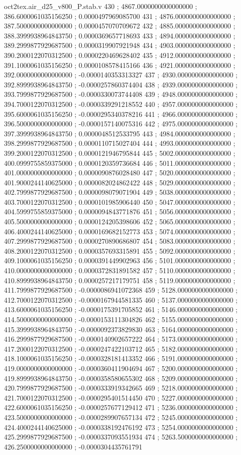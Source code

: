 \begin{filecontents}[overwrite]{oct2tex.air_d25_v800_P.stab.v}
430 ; 4867.0000000000000000 ; 386.6000061035156250 ; 0.0000497969085700
431 ; 4876.0000000000000000 ; 387.5000000000000000 ; 0.0000457070709672
432 ; 4885.0000000000000000 ; 388.3999938964843750 ; 0.0000369657718693
433 ; 4894.0000000000000000 ; 389.2999877929687500 ; 0.0000319907921948
434 ; 4903.0000000000000000 ; 390.2000122070312500 ; 0.0000220469628402
435 ; 4912.0000000000000000 ; 391.1000061035156250 ; 0.0000108578415166
436 ; 4921.0000000000000000 ; 392.0000000000000000 ; -0.0000140353313327
437 ; 4930.0000000000000000 ; 392.8999938964843750 ; -0.0000257860374404
438 ; 4939.0000000000000000 ; 393.7999877929687500 ; -0.0000330073744408
439 ; 4948.0000000000000000 ; 394.7000122070312500 ; -0.0000339291218552
440 ; 4957.0000000000000000 ; 395.6000061035156250 ; -0.0000295340378216
441 ; 4966.0000000000000000 ; 396.5000000000000000 ; -0.0000157140075316
442 ; 4975.0000000000000000 ; 397.3999938964843750 ; 0.0000048512533795
443 ; 4984.0000000000000000 ; 398.2999877929687500 ; 0.0000110715027404
444 ; 4993.0000000000000000 ; 399.2000122070312500 ; 0.0000121946795844
445 ; 5002.0000000000000000 ; 400.0999755859375000 ; 0.0000120359736684
446 ; 5011.0000000000000000 ; 401.0000000000000000 ; 0.0000090876028480
447 ; 5020.0000000000000000 ; 401.9000244140625000 ; 0.0000082024862422
448 ; 5029.0000000000000000 ; 402.7999877929687500 ; 0.0000098079071904
449 ; 5038.0000000000000000 ; 403.7000122070312500 ; 0.0000101985906440
450 ; 5047.0000000000000000 ; 404.5999755859375000 ; 0.0000094843771876
451 ; 5056.0000000000000000 ; 405.5000000000000000 ; 0.0000124205398606
452 ; 5065.0000000000000000 ; 406.4000244140625000 ; 0.0000169682152773
453 ; 5074.0000000000000000 ; 407.2999877929687500 ; 0.0000270890686807
454 ; 5083.0000000000000000 ; 408.2000122070312500 ; 0.0000357693315891
455 ; 5092.0000000000000000 ; 409.1000061035156250 ; 0.0000391449902963
456 ; 5101.0000000000000000 ; 410.0000000000000000 ; 0.0000372831891582
457 ; 5110.0000000000000000 ; 410.8999938964843750 ; 0.0000257217179751
458 ; 5119.0000000000000000 ; 411.7999877929687500 ; -0.0000086941072368
459 ; 5128.0000000000000000 ; 412.7000122070312500 ; -0.0000167944581335
460 ; 5137.0000000000000000 ; 413.6000061035156250 ; -0.0000175391705852
461 ; 5146.0000000000000000 ; 414.5000000000000000 ; -0.0000153111304826
462 ; 5155.0000000000000000 ; 415.3999938964843750 ; -0.0000092373829830
463 ; 5164.0000000000000000 ; 416.2999877929687500 ; -0.0000140902657222
464 ; 5173.0000000000000000 ; 417.2000122070312500 ; -0.0000247422103712
465 ; 5182.0000000000000000 ; 418.1000061035156250 ; -0.0000328181413352
466 ; 5191.0000000000000000 ; 419.0000000000000000 ; -0.0000360411904694
467 ; 5200.0000000000000000 ; 419.8999938964843750 ; -0.0000358580655302
468 ; 5209.0000000000000000 ; 420.7999877929687500 ; -0.0000333919342665
469 ; 5218.0000000000000000 ; 421.7000122070312500 ; -0.0000295401514450
470 ; 5227.0000000000000000 ; 422.6000061035156250 ; -0.0000257677129412
471 ; 5236.0000000000000000 ; 423.5000000000000000 ; -0.0000289907657134
472 ; 5245.0000000000000000 ; 424.4000244140625000 ; -0.0000338192476192
473 ; 5254.0000000000000000 ; 425.2999877929687500 ; -0.0000337093551934
474 ; 5263.5000000000000000 ; 426.2500000000000000 ; -0.0000304435761791
\end{filecontents}
